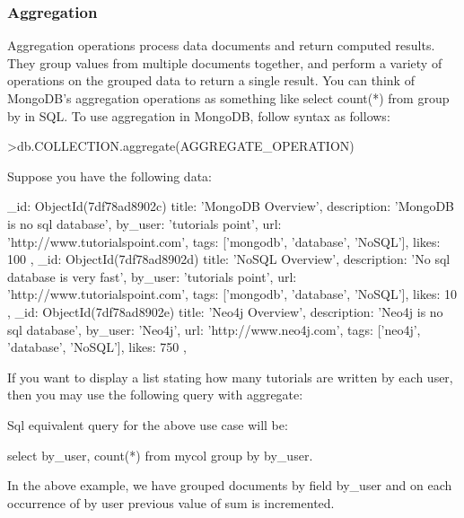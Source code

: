 \documentclass[12pt]{article}
\begin{document}
\begin{bashcode}
\begin{bashcode}
\newpage
\subsubsection{Aggregation}

Aggregation operations process data documents and return computed
results. They group values from multiple documents
together, and perform a variety of operations on the grouped data to
return a single result. You can think of MongoDB's aggregation
operations as something like select count(*) from group by in SQL.
To use aggregation in MongoDB, follow syntax as follows:

\begin{bashcode}
>db.COLLECTION.aggregate(AGGREGATE_OPERATION)
\end{bashcode}

Suppose you have the following data:

\begin{javascriptcode}

{
   _id: ObjectId(7df78ad8902c)
   title: 'MongoDB Overview', 
   description: 'MongoDB is no sql database',
   by_user: 'tutorials point',
   url: 'http://www.tutorialspoint.com',
   tags: ['mongodb', 'database', 'NoSQL'],
   likes: 100
},
{
   _id: ObjectId(7df78ad8902d)
   title: 'NoSQL Overview', 
   description: 'No sql database is very fast',
   by_user: 'tutorials point',
   url: 'http://www.tutorialspoint.com',
   tags: ['mongodb', 'database', 'NoSQL'],
   likes: 10
},
{
   _id: ObjectId(7df78ad8902e)
   title: 'Neo4j Overview', 
   description: 'Neo4j is no sql database',
   by_user: 'Neo4j',
   url: 'http://www.neo4j.com',
   tags: ['neo4j', 'database', 'NoSQL'],
   likes: 750
},
\end{javascriptcode}

If you want to display a list stating how many tutorials are written by
each user, then you may use the following query with aggregate:

Sql equivalent query for the above use case will be:

\begin{sqlcode}
select by_user, count(*) from mycol group by by_user.
\end{sqlcode}

In the above example, we have grouped documents by field by\_user and on
each occurrence of by user previous value of sum is incremented.


\end{bashcode}
\end{bashcode}
\end{document}
